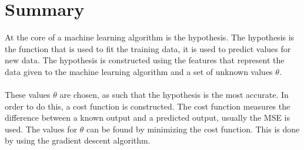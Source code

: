 \section{Summary}
At the core of a machine learning algorithm is the hypothesis. The hypothesis is the function that is used to fit the training data, it is used to predict values for new data. The hypothesis is constructed using the features that represent the data given to the machine learning algorithm and a set of unknown values $\theta$. \\\\
These values $\theta$ are chosen, as such that the hypothesis is the most accurate. In order to do this, a cost function is constructed. The cost function measures the difference between a known output and a predicted output, usually the MSE is used. The values for $\theta$ can be found by minimizing the cost function. This is done by using the gradient descent algorithm. 

